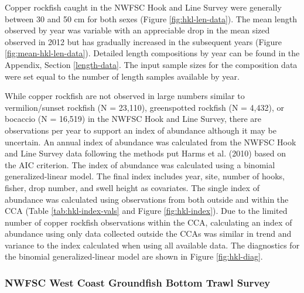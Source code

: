 \documentclass[11pt,
  english,
  a4paper,
]{article}
\begin{document}

Copper rockfish caught in the NWFSC Hook and Line Survey were generally between 30 and 50 cm for both sexes (Figure \ref{fig:hkl-len-data}). The mean length observed by year was variable with an appreciable drop in the mean sized observed in 2012 but has gradually increased in the subsequent years (Figure \ref{fig:mean-hkl-len-data}). Detailed length compositions by year can be found in the Appendix, Section \ref{length-data}. The input sample sizes for the composition data were set equal to the number of length samples available by year.

\leavevmode\tagmcend\tagstructend\par


While copper rockfish are not observed in large numbers similar to vermilion/sunset rockfish (N = 23,110), greenspotted rockfish (N = 4,432), or bocaccio (N = 16,519) in the NWFSC Hook and Line Survey, there are observations per year to support an index of abundance although it may be uncertain. An annual index of abundance was calculated from the NWFSC Hook and Line Survey data following the methods put Harms et al. {(2010)\leavevmode\tagmcend\tagstructend} based on the AIC criterion. The index of abundance was calculated using a binomial generalized-linear model. The final index includes year, site, number of hooks, fisher, drop number, and swell height as covariates. The single index of abundance was calculated using observations from both outside and within the CCA (Table \ref{tab:hkl-index-vals} and Figure \ref{fig:hkl-index}). Due to the limited number of copper rockfish observations within the CCA, calculating an index of abundance using only data collected outside the CCAs was similar in trend and variance to the index calculated when using all available data. The diagnostics for the binomial generalized-linear model are shown in Figure \ref{fig:hkl-diag}.

\leavevmode\tagmcend\tagstructend\par


\hypertarget{nwfsc-west-coast-groundfish-bottom-trawl-survey}{%
\subsubsection{NWFSC West Coast Groundfish Bottom Trawl Survey}\label{nwfsc-west-coast-groundfish-bottom-trawl-survey}}
\end{document}
